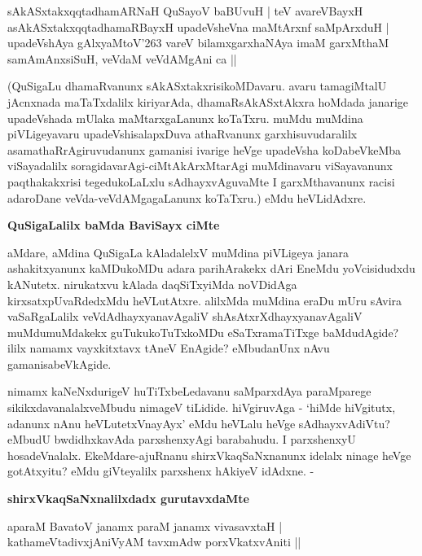\begin{shloka}
sAkASxtakxqqtadhamARNaH QuSayoV baBUvuH | teV avareVBayxH\\\label{106}
asAkASxtakxqqtadhamaRBayxH upadeVsheVna maMtArxnf saMpArxduH |\\
upadeVshAya gAlxyaMtoV\char'263 vareV bilamxgarxhaNAya imaM garxMthaM\\
samAmAnxsiSuH, veVdaM veVdAMgAni ca ||
\end{shloka}

\noindent
(QuSigaLu dhamaRvanunx sAkASxtakxrisikoMDavaru. avaru tamagiMtalU \hbox{jAcnxnada} maTaTxdalilx kiriyarAda, dhamaRsAkASxtAkxra hoMdada janarige upadeVshada mUlaka maMtarxgaLanunx koTaTxru. muMdu muMdina piVLigeyavaru upadeVshisalapxDuva athaRvanunx garxhisuvudaralilx asamathaRrAgiruvudanunx gamanisi ivarige heVge upadeVsha koDabeVkeMba viSayadalilx soragidavarAgi-ciMtAkArxMtarAgi muMdinavaru viSayavanunx paqthakakxrisi tegedukoLaLxlu sAdhayxvAguvaMte I garxMthavanunx racisi adaroDane veVda-veVdAMgagaLanunx koTaTxru.) eMdu heVLidAdxre.

{\bigskip
\noindent
{\large\bf QuSigaLalilx baMda BaviSayx ciMte}}\label{page106}
\medskip

\noindent
aMdare, aMdina QuSigaLa kAladalelxV muMdina piVLigeya janara ashakitxyanunx kaMDukoMDu adara parihArakekx dAri EneMdu yoVcisidudxdu kANutetx. nirukatxvu kAlada daqSiTxyiMda noVDidAga kirxsatxpUvaRdedxMdu heVLutAtxre. alilxMda muMdina eraDu mUru sAvira vaSaRgaLalilx veVdAdhayxyanavAgaliV shAsAtxrXdhayxyanavAgaliV muMdumuMdakekx guTukukoTuTxkoMDu eSaTxramaTiTxge baMdudAgide? ililx namamx vayxkitxtavx tAneV EnAgide? eMbudanUnx nAvu gamanisabeVkAgide.

nimamx kaNeNxdurigeV huTiTxbeLedavanu saMparxdAya paraMparege sikikxdavanalalxveMbudu nimageV tiLidide. hiVgiruvAga - `hiMde hiVgitutx, adanunx nAnu heVLutetxVnayAyx' eMdu heVLalu heVge sAdhayxvAdiVtu? eMbudU bwdidhxkavAda parxshenxyAgi barabahudu. I parxshenxyU hosadeVnalalx. EkeMdare-ajuRnanu shirxVkaqSaNxnanunx idelalx ninage heVge gotAtxyitu? eMdu giVteyalilx parxshenx hAkiyeV idAdxne. -

{\bigskip
\noindent
{\large\bf shirxVkaqSaNxnalilxdadx gurutavxdaMte}}\label{page107}
\medskip

\begin{shloka}
aparaM BavatoV janamx paraM janamx vivasavxtaH |\\\label{107}
kathameVtadivxjAniVyAM tavxmAdw porxVkatxvAniti ||
\end{shloka}

